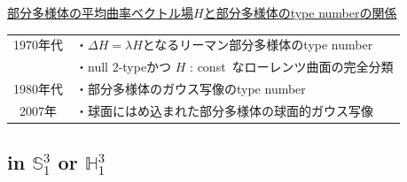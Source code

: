 \documentclass[dvipdfmx, xcolor=svgnames]{beamer}
\theoremstyle{plain}
\theoremstyle{definition}
\theoremstyle{remark}
\begin{document}
{\underline{部分多様体の平均曲率ベクトル場\(H\)と部分多様体のtype numberの関係}
\begin{table}
  \hspace{-10pt}
   \begin{tabular}{cl}
     1970年代 & ・\(\Delta H=\lambda H\)となるリーマン部分多様体のtype number\\
          & ・null \(2\)-typeかつ \(H\) : const\, なローレンツ曲面の完全分類\vspace{5pt}\\
     1980年代 & ・部分多様体のガウス写像のtype number \vspace{5pt}\\
     2007年 & ・球面にはめ込まれた部分多様体の球面的ガウス写像   
   \end{tabular}
   \vspace{10pt}
 \end{table}
}





\subsection{in \(\mathbb{S}^3_1\) or \(\mathbb{H}^3_1\)}
\end{document}
